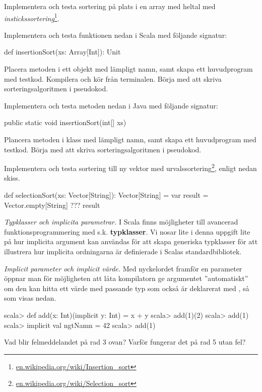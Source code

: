 \Task Implementera och testa sortering på plats i en array med heltal med \emph{instickssortering}\footnote{\href{https://en.wikipedia.org/wiki/Insertion_sort}{en.wikipedia.org/wiki/Insertion\_sort}}. 

\Subtask Implementera och testa funktionen nedan i Scala med följande signatur:
\begin{Code}
  def insertionSort(xs: Array[Int]): Unit 
\end{Code}
Placera metoden i ett objekt med lämpligt namn, samt skapa ett huvudprogram med testkod. Kompilera och kör från terminalen. Börja med att skriva sorteringsalgoritmen i pseudokod.

\Subtask Implementera och testa metoden nedan i Java med följande signatur:
\begin{Code}[language=Java]
  public static void insertionSort(int[] xs) 
\end{Code}
Plancera metoden i klass med lämpligt namn, samt skapa ett huvudprogram med testkod. Börja med att skriva sorteringsalgoritmen i pseudokod.

\Task Implementera och testa sortering till ny vektor med urvalssortering\footnote{\href{https://en.wikipedia.org/wiki/Selection_sort}{en.wikipedia.org/wiki/Selection\_sort}}, enligt nedan skiss.
\begin{Code}
def selectionSort(xs: Vector[String]): Vector[String] = {
  var result = Vector.empty[String]
  ???
  result
}
\end{Code} 


\AdvancedTasks %

\Task \emph{Typklasser och implicita parametrar.} I Scala finns möjligheter till avancerad funktionsprogrammering med s.k. \textbf{typklasser}. Vi nosar lite i denna uppgift lite på hur implicita argument kan användas för att skapa generiska typklasser för att illustrera hur implicita ordningarna är definierade i Scalas standardbibliotek. 

\Subtask \emph{Implicit parameter och implicit värde.} Med nyckelordet  framför en parameter öppnar man för möjligheten att låta kompilatorn ge argumentet ''automatiskt'' om den kan hitta ett värde med passande typ som också är deklarerat med , så som visas nedan. 
\begin{REPL}
scala> def add(x: Int)(implicit y: Int) = x + y
scala> add(1)(2)
scala> add(1)
scala> implicit val ngtNamn = 42   
scala> add(1)
\end{REPL}
Vad blir felmeddelandet på rad 3 ovan? Varför fungerar det på rad 5 utan fel?

